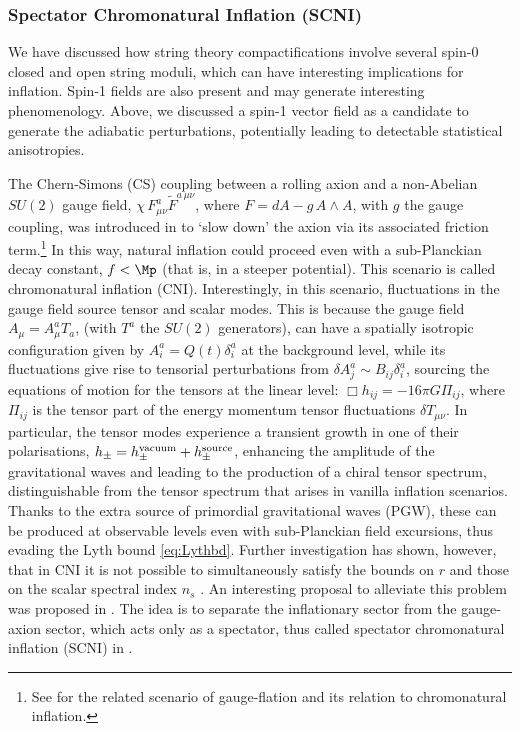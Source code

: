 \subsubsection*{Spectator Chromonatural Inflation (SCNI)}

We have discussed how string theory compactifications involve several spin-0 closed and open string moduli, which can have interesting implications for inflation. 
Spin-1 fields are also present and may generate  interesting phenomenology. Above, we discussed a spin-1 vector field as a candidate to generate the adiabatic perturbations, potentially leading to detectable statistical anisotropies. 

The Chern-Simons (CS) coupling between a rolling axion and a non-Abelian $SU(2)$ gauge field,  $\chi\,F_{\mu\nu}^a\tilde F^{a\,\mu\nu}$, where $F=dA-g\, A\wedge A$, with $g$ the gauge coupling, was introduced in \cite{Adshead:2012kp} to `slow down' the axion via its associated friction term.\footnote{See \cite{Maleknejad:2011sq,Maleknejad:2011jw,Adshead:2012qe,Sheikh-Jabbari:2012tom} for the  related scenario of gauge-flation and its relation to chromonatural inflation.} In this way, natural inflation could  proceed even  with a sub-Planckian decay constant, $f<\Mp$ (that is, in a steeper potential). This scenario is called chromonatural inflation (CNI). Interestingly, in this scenario, fluctuations in the gauge field source tensor and scalar modes. This is because the gauge field  
$A_\mu=A_\mu^aT_a$, (with $T^a$ the $SU(2)$ generators), can have a spatially isotropic configuration given by $A^a_i=Q(t)\delta_i^a$ at the background level, while its  fluctuations give rise to tensorial perturbations from $\delta A_j^a \sim B_{ij}\delta_i^a$, sourcing the equations of motion for the tensors at the linear level:  $\Box h_{ij} =-16\pi G \Pi_{ij}$, where $\Pi_{ij}$ is the tensor part of the energy momentum tensor fluctuations $\delta T_{\mu\nu}$. 
In particular, the tensor modes experience a transient growth in one of their polarisations,  $h_{\pm} = h_{\pm}^{\rm vacuum} + h_{\pm}^{\rm source}$, 
enhancing the amplitude of the gravitational waves and  leading to the production of a chiral tensor spectrum, distinguishable from the tensor spectrum that arises in vanilla inflation scenarios. Thanks to the extra source of primordial gravitational waves (PGW), these can be produced at observable levels even with sub-Planckian field excursions, thus evading the Lyth bound \eqref{eq:Lythbd}. 
Further investigation has shown, however, that in CNI it is not possible to simultaneously satisfy the bounds on $r$ and those on the scalar spectral index $n_s$ \cite{Adshead:2013qp,Adshead:2013nka}. An interesting proposal to alleviate this problem was proposed in \cite{Dimastrogiovanni:2016fuu}. The idea is to separate the inflationary sector from the gauge-axion sector, which  acts only as a spectator, thus called spectator chromonatural inflation (SCNI) in \cite{Holland:2020jdh}.
